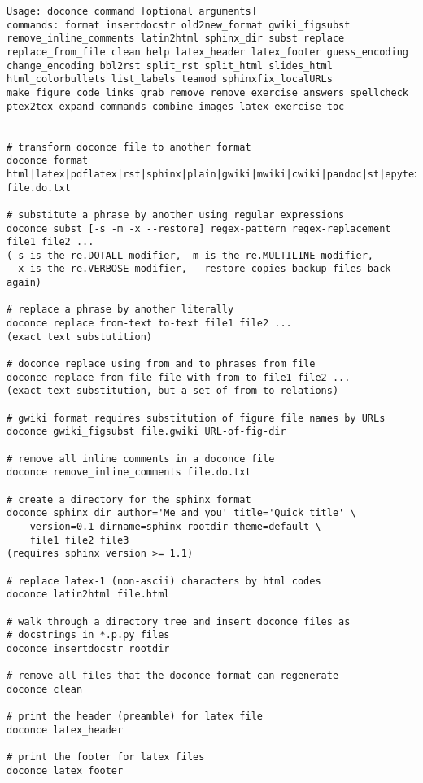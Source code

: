 \documentclass[%
oneside,                 %
final,                   %
10pt]{article}
\begin{document}
\begin{Verbatim}[numbers=none,fontsize=\fontsize{9pt}{9pt},baselinestretch=0.85,xleftmargin=0mm]
Usage: doconce command [optional arguments]
commands: format insertdocstr old2new_format gwiki_figsubst remove_inline_comments latin2html sphinx_dir subst replace replace_from_file clean help latex_header latex_footer guess_encoding change_encoding bbl2rst split_rst split_html slides_html html_colorbullets list_labels teamod sphinxfix_localURLs make_figure_code_links grab remove remove_exercise_answers spellcheck ptex2tex expand_commands combine_images latex_exercise_toc


# transform doconce file to another format
doconce format html|latex|pdflatex|rst|sphinx|plain|gwiki|mwiki|cwiki|pandoc|st|epytext file.do.txt

# substitute a phrase by another using regular expressions
doconce subst [-s -m -x --restore] regex-pattern regex-replacement file1 file2 ...
(-s is the re.DOTALL modifier, -m is the re.MULTILINE modifier,
 -x is the re.VERBOSE modifier, --restore copies backup files back again)

# replace a phrase by another literally
doconce replace from-text to-text file1 file2 ...
(exact text substutition)

# doconce replace using from and to phrases from file
doconce replace_from_file file-with-from-to file1 file2 ...
(exact text substitution, but a set of from-to relations)

# gwiki format requires substitution of figure file names by URLs
doconce gwiki_figsubst file.gwiki URL-of-fig-dir

# remove all inline comments in a doconce file
doconce remove_inline_comments file.do.txt

# create a directory for the sphinx format
doconce sphinx_dir author='Me and you' title='Quick title' \
    version=0.1 dirname=sphinx-rootdir theme=default \
    file1 file2 file3
(requires sphinx version >= 1.1)

# replace latex-1 (non-ascii) characters by html codes
doconce latin2html file.html

# walk through a directory tree and insert doconce files as
# docstrings in *.p.py files
doconce insertdocstr rootdir

# remove all files that the doconce format can regenerate
doconce clean

# print the header (preamble) for latex file
doconce latex_header

# print the footer for latex files
doconce latex_footer


\end{Verbatim}
\end{document}
